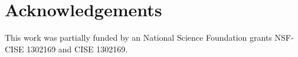 \documentclass{sig-alternate}
\newcommand{\fig}[1]{Figure~\ref{fig:#1}}
\begin{document}





\section*{Acknowledgements}
This work was partially funded by an National Science
Foundation grants NSF-CISE 1302169 and CISE 1302169.

\clearpage
\vspace*{0.5mm}
\scriptsize

 
\end{document}
